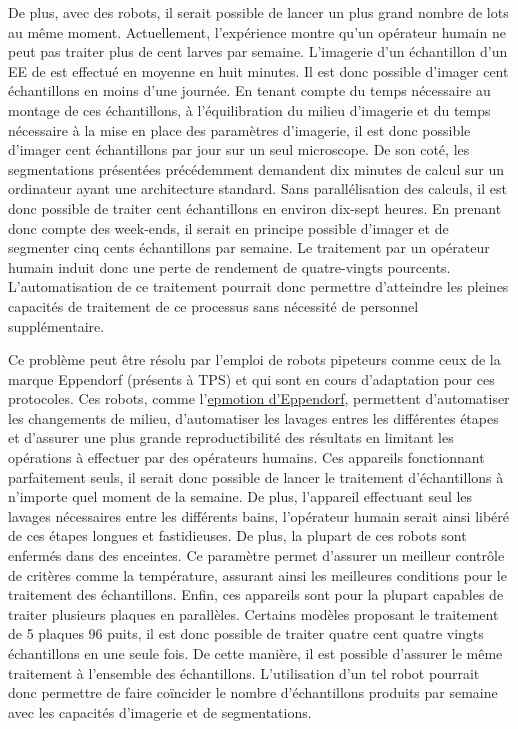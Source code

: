 \documentclass[\main/main.tex]{subfiles}
\begin{document}
De plus, avec des robots,  il serait possible de lancer un plus grand nombre de lots au même moment.
%
Actuellement, l'expérience montre qu'un opérateur humain ne peut pas traiter plus de cent larves par semaine.
%
L'imagerie d'un échantillon d'un EE de \pz{} est effectué en moyenne en huit minutes.
%
Il est donc possible d'imager cent échantillons en moins d'une journée.
%
En tenant compte du temps nécessaire au montage de ces échantillons,
à l'équilibration du milieu d'imagerie et du temps nécessaire à la mise en place des paramètres d'imagerie,
il est donc possible d'imager cent échantillons par jour sur un seul microscope. 
%
De son coté, les segmentations présentées précédemment demandent dix minutes de calcul sur un ordinateur ayant une architecture standard.
%
Sans parallélisation des calculs, il est donc possible de traiter cent échantillons en environ dix-sept heures.
%
En prenant donc compte des week-ends, il serait en principe possible d'imager et de segmenter cinq cents échantillons par semaine.
%
Le traitement \ihc{} par un opérateur humain induit donc une perte de rendement de quatre-vingts pourcents.
%
L'automatisation de ce traitement pourrait donc permettre d'atteindre les pleines capacités de traitement de ce processus sans nécessité de personnel supplémentaire.

%
Ce problème peut être résolu par l'emploi de robots pipeteurs comme ceux de la marque Eppendorf (présents à TPS) et qui sont en cours d'adaptation pour ces protocoles.
%
Ces robots,
comme l'\href{https://online-shop.eppendorf.fr/FR-fr/Automates-de-pipetage-44509.html#goto-Automates-de-pipetage-WebPMain-44509}{epmotion d'Eppendorf},
permettent d'automatiser les changements de milieu, d'automatiser les lavages entres les différentes étapes
et d'assurer une plus grande reproductibilité des résultats en limitant les opérations à effectuer par des opérateurs humains.
%
Ces appareils fonctionnant parfaitement seuls, il serait donc possible de lancer le traitement d'échantillons à n'importe quel moment de la semaine.
%
De plus, l'appareil effectuant seul les lavages nécessaires entre les différents bains,
l'opérateur humain serait ainsi libéré de ces étapes longues et fastidieuses.
%
De plus, la plupart de ces robots sont enfermés dans des enceintes.
%
Ce paramètre permet d'assurer un meilleur contrôle de critères comme la température,
assurant ainsi les meilleures conditions pour le traitement des échantillons.
%
Enfin, ces appareils sont pour la plupart capables de traiter plusieurs plaques en parallèles.
%
Certains modèles proposant le traitement de 5 plaques 96 puits, il est donc possible de traiter quatre cent quatre vingts échantillons en une seule fois.
%
De cette manière, il est possible d'assurer le même traitement à l'ensemble des échantillons.
%
L'utilisation d'un tel robot pourrait donc permettre de faire coïncider le nombre d'échantillons produits par semaine avec les capacités d'imagerie et de segmentations.
\end{document}
